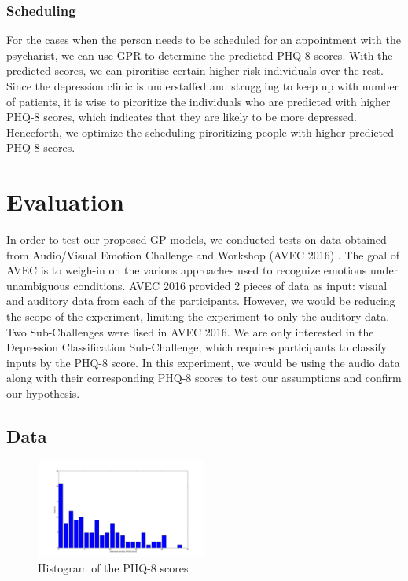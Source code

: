 \documentclass{article}
\begin{document}
	\subsubsection{Scheduling}
	For the cases when the person needs to be scheduled for an appointment with the psycharist, we can use GPR to determine the predicted PHQ-8 scores. With the predicted scores, we can piroritise certain higher risk individuals over the rest. Since the depression clinic is understaffed and struggling to keep up with number of patients, it is wise to piroritize the individuals who are predicted with higher PHQ-8 scores, which indicates that they are likely to be more depressed. Henceforth, we optimize the scheduling piroritizing people with higher predicted PHQ-8 scores.

	\section{Evaluation}
	In order to test our proposed GP models, we conducted tests on data obtained from Audio/Visual Emotion Challenge and Workshop (AVEC 2016) \cite{avec2016}. 
	The goal of AVEC is to weigh-in on the various approaches used to recognize emotions under unambiguous conditions. 
	AVEC 2016 provided 2 pieces of data as input: visual and auditory data from each of the participants. 
	However, we would be reducing the scope of the experiment, limiting the experiment to only the auditory data. 
	Two Sub-Challenges were lised in AVEC 2016. 
	We are only interested in the Depression Classification Sub-Challenge, which requires participants to classify inputs by the PHQ-8 score. 
	In this experiment, we would be using the audio data along with their corresponding PHQ-8 scores to test our assumptions and confirm our hypothesis.

	\subsection{Data}
	\begin{figure}[h]
	\center
 	\includegraphics[width=0.5\textwidth]{histogram_phq8}
	\caption{Histogram of the PHQ-8 scores}
	\label{histogram_phq8}
	\end{figure}
	
\end{document}
